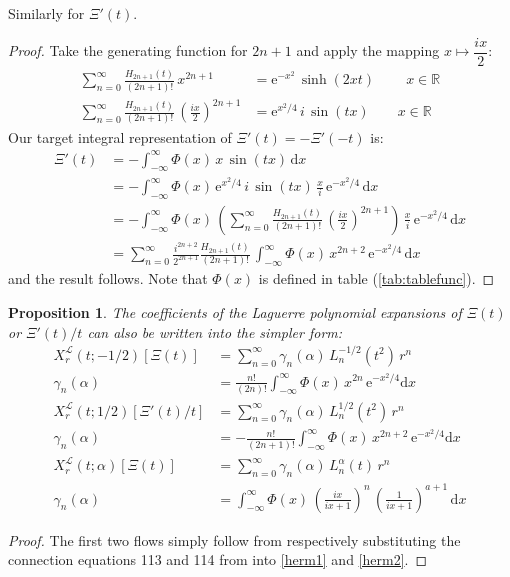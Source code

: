 \documentclass[a4paper,11pt,twoside]{amsart}
\newtheorem{proposition}[theorem]{Proposition}
\newcommand{\verifiedeq}{=}
\newcommand{\verifiedeq}{\stackrel{\checkmark}{=}}
\begin{document}
Similarly for $\Xi'(t)$. 
\begin{proof}
Take the generating function for $2n+1$ and apply the mapping $x \mapsto \dfrac{ix}{2}$:
\begin{align}
 \sum_{n=0}^\infty \frac{H_{2n+1}(t)}{(2n+1)!}\, x^{2n+1} &\verifiedeq \mathrm{e}^{-x^2}\,\sinh(2xt) \ \qquad x \in \mathbb{R} \\
 \sum_{n=0}^\infty \frac{H_{2n+1}(t)}{(2n+1)!}\,\left(\frac{ix}{2}\right)^{2n+1} &\verifiedeq  \mathrm{e}^{x^2/4}\,i\,\sin(tx)\qquad x \in \mathbb{R}
\end{align}
Our target integral representation of $\Xi'(t) = -\Xi'(-t)$ is:
\begin{align}
 \Xi'(t) &\verifiedeq -\int_{-\infty}^\infty \Phi(x)\,x\,\sin(tx)\, \mathrm{d}x \\
  & \verifiedeq -\int_{-\infty}^\infty \Phi(x)\,\mathrm{e}^{x^2/4}\,i\,\sin(tx)\,\frac{x}{i}\,\mathrm{e}^{-x^2/4}\,\mathrm{d}x \\
  & \verifiedeq -\int_{-\infty}^\infty \Phi(x)\,\left(\sum_{n=0}^\infty \frac{H_{2n+1}(t)}{(2n+1)!}\,\left(\frac{ix}{2}\right)^{2n+1} \right)\,\frac{x}{i}\,\mathrm{e}^{-x^2/4}\,\mathrm{d}x \\
  & \verifiedeq \sum_{n=0}^\infty \frac{i^{2n+2}}{2^{2n+1}}\frac{H_{2n+1}(t)}{(2n+1)!}\,\int_{-\infty}^\infty \Phi(x)\,x^{2n+2}\,\mathrm{e}^{-x^2/4}\,\mathrm{d}x
\end{align}
and the result follows. Note that $\Phi(x)$ is defined in table (\ref{tab:tablefunc}).
\end{proof}

\begin{proposition}
The coefficients of the Laguerre polynomial expansions of $\Xi(t)$ or $\Xi'(t)/t$ can also be written into the simpler form: 
\begin{align}
X^{\mathcal{L}}_r(t;-1/2)\left[\Xi(t)\right] &\verifiedeq \sum_{n=0}^\infty \gamma_n(\alpha)\,L^{-1/2}_n(t^2)\,r^n \\
\gamma_n(\alpha) &\verifiedeq \frac{n!}{(2n)!}\int_{-\infty}^{\infty} \Phi(x)\,x^{2n}\,\mathrm{e}^{-x^2/4}\mathrm{d}x \\
X^{\mathcal{L}}_r(t;1/2)\left[\Xi'(t)/t\right] &\verifiedeq \sum_{n=0}^\infty \gamma_n(\alpha)\,L^{1/2}_n(t^2)\,r^n \\
\gamma_n(\alpha) &\verifiedeq -\frac{n!}{(2n+1)!}\int_{-\infty}^{\infty} \Phi(x)\,x^{2n+2}\,\mathrm{e}^{-x^2/4}\mathrm{d}x \\
X^{\mathcal{L}}_r(t;\alpha)\left[\Xi(t)\right] &\verifiedeq \sum_{n=0}^\infty \gamma_n(\alpha)\,L^{\alpha}_n(t)\,r^n \\
\gamma_n(\alpha) &\verifiedeq \int_{-\infty}^{\infty} \Phi(x)\,\left(\frac{ix}{ix+1}\right)^n\,\left(\frac{1}{ix+1}\right)^{a+1}\,\mathrm{d}x
\end{align}
\end{proposition}
\begin{proof}
The first two flows simply follow from respectively substituting the connection equations 113 and 114 from \cite{koesup} into \ref{herm1} and \ref{herm2}.  
\end{proof}
\end{document}
